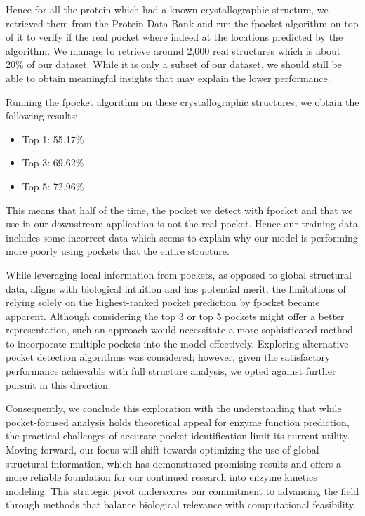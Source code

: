 Hence for all the protein which had a known crystallographic structure, we retrieved them from the Protein Data Bank and run the fpocket algorithm on top of it to verify if the real pocket where indeed at the locations predicted by the algorithm. We manage to retrieve around 2,000 real structures which is about 20\% of our dataset. While it is only a subset of our dataset, we should still be able to obtain meaningful insights that may explain the lower performance.

Running the fpocket algorithm on these crystallographic structures, we obtain the following results:
\begin{itemize}
  \item Top 1: 55.17\%
  \item Top 3: 69.62\%
  \item Top 5: 72.96\%
\end{itemize}
This means that half of the time, the pocket we detect with fpocket and that we use in our downstream application
is not the real pocket. Hence our training data includes some incorrect data which seems to explain why
our model is performing more poorly using pockets that the entire structure.

While leveraging local information from pockets, as opposed to global structural data, aligns with biological intuition and has potential merit, the limitations of relying solely on the highest-ranked pocket prediction by fpocket became apparent. Although considering the top 3 or top 5 pockets might offer a better representation, such an approach would necessitate a more sophisticated method to incorporate multiple pockets into the model effectively. Exploring alternative pocket detection algorithms was considered; however, given the satisfactory performance achievable with full structure analysis, we opted against further pursuit in this direction.

Consequently, we conclude this exploration with the understanding that while pocket-focused analysis holds theoretical appeal for enzyme function prediction, the practical challenges of accurate pocket identification limit its current utility. Moving forward, our focus will shift towards optimizing the use of global structural information, which has demonstrated promising results and offers a more reliable foundation for our continued research into enzyme kinetics modeling. This strategic pivot underscores our commitment to advancing the field through methods that balance biological relevance with computational feasibility.